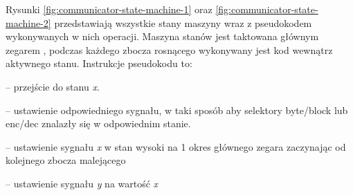 Rysunki \ref{fig:communicator-state-machine-1} oraz \ref{fig:communicator-state-machine-2} przedstawiają wszystkie stany maszyny wraz z pseudokodem wykonywanych w nich operacji. Maszyna stanów jest taktowana głównym zegarem , podczas każdego zbocza rosnącego wykonywany jest kod wewnątrz aktywnego stanu. Instrukcje pseudokodu to:
\begin{description}[noitemsep]
	\item[\textbf{state \textit{x}}] -- przejście do stanu \textit{x}.
	\item[\textbf{mux \textit{x}}] -- ustawienie odpowiedniego sygnału, w taki sposób aby selektory byte/block lub enc/dec znalazły się w odpowiednim stanie.
	\item[\textbf{trigger \textit{x}}] -- ustawienie sygnału \textit{x} w stan wysoki na 1 okres głównego zegara zaczynając od kolejnego zbocza malejącego 
	\item[\textbf{store \textit{x} into \textit{y}}] -- ustawienie sygnału \textit{y} na wartość \textit{x}
\end{description}


